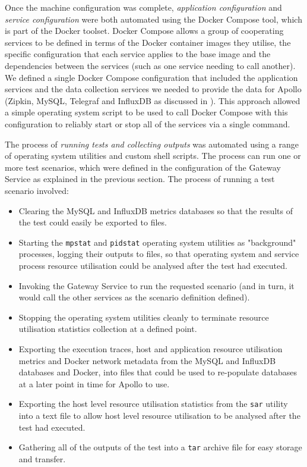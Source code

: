 Once the machine configuration was complete, \emph{application configuration} and \emph{service configuration} were both automated using the Docker Compose tool, which is part of the Docker toolset.  Docker Compose allows a group of cooperating services to be defined in terms of the Docker container images they utilise, the specific configuration that each service applies to the base image and the dependencies between the services (such as one service needing to call another).  We defined a single Docker Compose configuration that included the application services and the data collection services we needed to provide the data for Apollo (Zipkin, MySQL, Telegraf and InfluxDB as discussed in ).  This approach allowed a simple operating system script to be used to call Docker Compose with this configuration to reliably start or stop all of the services via a single command.

The process of \emph{running tests and collecting outputs} was automated using a range of operating system utilities and custom shell scripts.  The process can run one or more test scenarios, which were defined in the configuration of the Gateway Service as explained in the previous section.  The process of running a test scenario involved:
\begin{itemize}
	\item Clearing the MySQL and InfluxDB metrics databases so that the results of the test could easily be exported to files.
	\item Starting the \texttt{mpstat} and \texttt{pidstat} operating system utilities as "background" processes, logging their outputs to files, so that operating system and service process resource utilisation could be analysed after the test had executed.
	\item Invoking the Gateway Service to run the requested scenario (and in turn, it would call the other services as the scenario definition defined).
	\item Stopping the operating system utilities cleanly to terminate resource utilisation statistics collection at a defined point.
	\item Exporting the execution traces, host and application resource utilisation metrics and Docker network metadata from the MySQL and InfluxDB databases and Docker, into files that could be used to re-populate databases at a later point in time for Apollo to use.
	\item Exporting the host level resource utilisation statistics from the \texttt{sar} utility into a text file to allow host level resource utilisation to be analysed after the test had executed.
	\item Gathering all of the outputs of the test into a \texttt{tar} archive file for easy storage and transfer.
\end{itemize}


